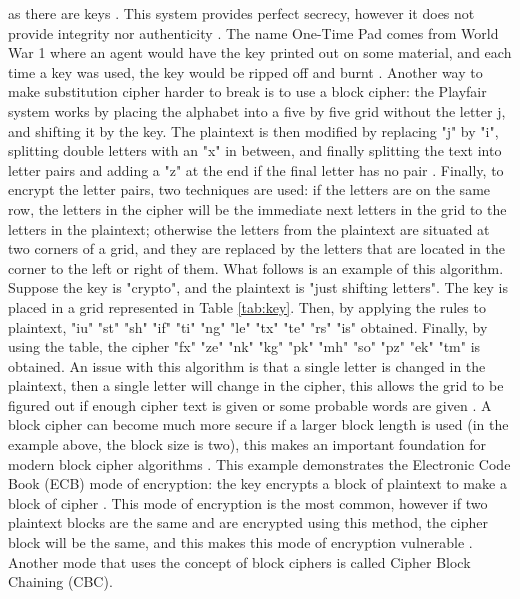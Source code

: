 \documentclass{l4proj}
\begin{document}
as there are keys \citep{savage_cse_2019} \citep{anderson_security_2008}. This system provides perfect secrecy, however it does not provide integrity nor authenticity 
\citep{savage_cse_2019}. The name One-Time Pad comes from World War 1 where an agent would have the key printed out on some material, and each time a key was used, the key would
be ripped off and burnt \citep{anderson_security_2008}. Another way to make substitution cipher harder to break is to use a block cipher: the Playfair system works by placing the
alphabet into a five by five grid without the letter j, and shifting it by the key. The plaintext is then modified by replacing "j" by "i", 
splitting double letters with an "x" in between, and finally splitting the text into letter pairs and adding a "z" at the end if the final letter has no pair \citep{anderson_security_2008}.
Finally, to encrypt the letter pairs, two techniques are used: if the letters are on the same row, the letters in the cipher will be the immediate next letters in the grid 
to the letters in the plaintext; otherwise the letters from the plaintext are situated at two corners of a grid, and they are replaced by the letters that are located in the corner to the left or right of them. 
What follows is an example of this algorithm. Suppose the key is "crypto", and the plaintext is "just shifting letters".
The key is placed in a grid represented in Table \ref{tab:key}. Then, by applying the rules to plaintext, "iu" "st" "sh" "if" "ti" "ng" "le" "tx" "te" "rs" "is" obtained.
Finally, by using the table, the cipher "fx" "ze" "nk" "kg" "pk" "mh" "so" "pz" "ek" "tm" is obtained. An issue with this algorithm is that a single letter is changed in the plaintext,
then a single letter will change in the cipher, this allows the grid to be figured out if enough cipher text is given or some probable words are given \citep{anderson_security_2008}.
A block cipher can become much more secure if a larger block length is used (in the example above, the block size is two), this makes an important foundation for modern block cipher algorithms
\citep{anderson_security_2008}. This example demonstrates the Electronic Code Book (ECB) mode of encryption: the key encrypts a block of plaintext to make a block of cipher \citep{kessler_overview_2016}.
This mode of encryption is the most common, however if two plaintext blocks are the same and are encrypted using this method, the cipher block will be the same, 
and this makes this mode of encryption vulnerable \citep{kessler_overview_2016}. Another mode that uses the concept of block ciphers is called Cipher Block Chaining (CBC).
\end{document}
